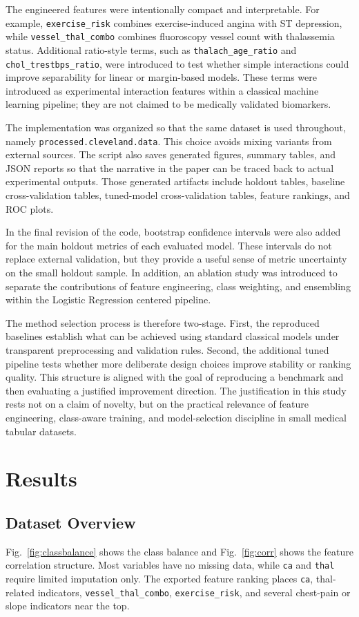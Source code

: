 \documentclass[conference]{IEEEtran}
\begin{document}
The engineered features were intentionally compact and interpretable. For example, \texttt{exercise\_risk} combines exercise-induced angina with ST depression, while \texttt{vessel\_thal\_combo} combines fluoroscopy vessel count with thalassemia status. Additional ratio-style terms, such as \texttt{thalach\_age\_ratio} and \texttt{chol\_trestbps\_ratio}, were introduced to test whether simple interactions could improve separability for linear or margin-based models. These terms were introduced as experimental interaction features within a classical machine learning pipeline; they are not claimed to be medically validated biomarkers.

The implementation was organized so that the same dataset is used throughout, namely \texttt{processed.cleveland.data}. This choice avoids mixing variants from external sources. The script also saves generated figures, summary tables, and JSON reports so that the narrative in the paper can be traced back to actual experimental outputs. Those generated artifacts include holdout tables, baseline cross-validation tables, tuned-model cross-validation tables, feature rankings, and ROC plots.

In the final revision of the code, bootstrap confidence intervals were also added for the main holdout metrics of each evaluated model. These intervals do not replace external validation, but they provide a useful sense of metric uncertainty on the small holdout sample. In addition, an ablation study was introduced to separate the contributions of feature engineering, class weighting, and ensembling within the Logistic Regression centered pipeline.

The method selection process is therefore two-stage. First, the reproduced baselines establish what can be achieved using standard classical models under transparent preprocessing and validation rules. Second, the additional tuned pipeline tests whether more deliberate design choices improve stability or ranking quality. This structure is aligned with the goal of reproducing a benchmark and then evaluating a justified improvement direction. The justification in this study rests not on a claim of novelty, but on the practical relevance of feature engineering, class-aware training, and model-selection discipline in small medical tabular datasets.

\section{Results}
\subsection{Dataset Overview}
Fig.~\ref{fig:classbalance} shows the class balance and Fig.~\ref{fig:corr} shows the feature correlation structure. Most variables have no missing data, while \texttt{ca} and \texttt{thal} require limited imputation only. The exported feature ranking places \texttt{ca}, thal-related indicators, \texttt{vessel\_thal\_combo}, \texttt{exercise\_risk}, and several chest-pain or slope indicators near the top.
\end{document}
